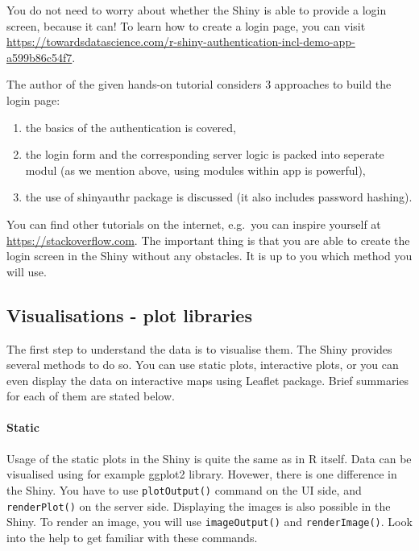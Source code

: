 \documentclass[
]{article}
\providecommand{\tightlist}{%
  \setlength{\itemsep}{0pt}\setlength{\parskip}{0pt}}
\begin{document}
You do not need to worry about whether the Shiny is able to provide a
login screen, because it can! To learn how to create a login page, you
can visit
\url{https://towardsdatascience.com/r-shiny-authentication-incl-demo-app-a599b86c54f7}.

The author of the given hands-on tutorial considers 3 approaches to
build the login page:

\begin{enumerate}
\def\labelenumi{\arabic{enumi}.}
\tightlist
\item
  the basics of the authentication is covered,
\item
  the login form and the corresponding server logic is packed into
  seperate modul (as we mention above, using modules within app is
  powerful),
\item
  the use of shinyauthr package is discussed (it also includes password
  hashing).
\end{enumerate}

You can find other tutorials on the internet, e.g.~you can inspire
yourself at \url{https://stackoverflow.com}. The important thing is that
you are able to create the login screen in the Shiny without any
obstacles. It is up to you which method you will use.

\hypertarget{visualisations---plot-libraries}{%
\subsection{Visualisations - plot
libraries}\label{visualisations---plot-libraries}}

The first step to understand the data is to visualise them. The Shiny
provides several methods to do so. You can use static plots, interactive
plots, or you can even display the data on interactive maps using
Leaflet package. Brief summaries for each of them are stated below.

\hypertarget{static}{%
\paragraph{Static}\label{static}}

Usage of the static plots in the Shiny is quite the same as in R itself.
Data can be visualised using for example ggplot2 library. Hovewer, there
is one difference in the Shiny. You have to use \texttt{plotOutput()}
command on the UI side, and \texttt{renderPlot()} on the server side.
Displaying the images is also possible in the Shiny. To render an image,
you will use \texttt{imageOutput()} and \texttt{renderImage()}. Look
into the help to get familiar with these commands.
\end{document}
